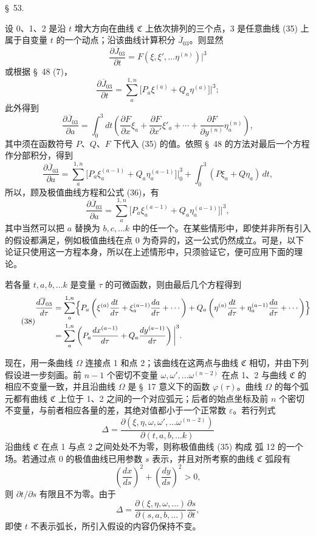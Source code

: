 \documentclass[11pt,a4paper,leqno]{article}
\begin{document}
\begin{center}
{\large \S~53.}
\end{center}

设 0、1、2 是沿 $t$ 增大方向在曲线 $\mathfrak{C}$ 上依次排列的三个点，3 是任意曲线 (35) 上属于自变量 $t$ 的一个动点；沿该曲线计算积分 $\overline{J}_{03}$。则显然
\[
\frac{\partial\overline{J}_{03}}{\partial t}
=F(\xi,\xi',\ldots\eta^{(n)})\bigg|^3
\]
或根据 \S~48 (7)，
\[
\frac{\partial\overline{J}_{03}}{\partial t}
=\sum_a^{1,n}\bigl[P_a\xi^{(a)}+Q_a\eta^{(a)}\bigr]\bigg|^3;
\]
此外得到
\[
\frac{\partial\overline{J}_{03}}{\partial a}
=\int_0^3 dt\left(\frac{\partial F}{\partial x}\xi_a+
\frac{\partial F}{\partial x'}\xi'_a+\cdots+
\frac{\partial F}{\partial y^{(n)}}\eta_a^{(n)}\right),
\]
其中须在函数符号 $P$、$Q$、$F$ 下代入 (35) 的值。依照 \S~48 的方法对最后一个方程作分部积分，得到
\[
\frac{\partial\overline{J}_{03}}{\partial a}
=\sum_a^{1,n}\bigl[P_a\xi_a^{(a-1)}+Q_a\eta_a^{(a-1)}\bigr]\bigg|_0^3
+\int_0^3(P\xi_a+Q\eta_a)\,dt,
\]
所以，顾及极值曲线方程和公式 (36)，有
\begin{equation}\tag{37}
\frac{\partial\overline{J}_{03}}{\partial a}
=\sum_a^{1,n}\bigl[P_a\xi_a^{(a-1)}+Q_a\eta_a^{(a-1)}\bigr]\bigg|^3,
\end{equation}
其中当然可以把 $a$ 替换为 $b,c,\ldots k$ 中的任一个。在某些情形中，即使并非所有引入的假设都满足，例如极值曲线在点 0 为奇异的，这一公式仍然成立。可是，以下论证只使用这一方程本身，所以在上述情形中，只须验证它，便可应用下面的理论。

若各量 $t,a,b,\ldots k$ 是变量 $\tau$ 的可微函数，则由最后几个方程得到
\begin{equation}\tag{38}
\begin{aligned}
\frac{d\overline{J}_{03}}{d\tau}
&=\sum_a^{1,n}\Bigl\{
P_a\left(\xi^{(a)}\frac{dt}{d\tau}+\xi_a^{(a-1)}\frac{da}{d\tau}+\cdots\right)
+Q_a\left(\eta^{(a)}\frac{dt}{d\tau}+\eta_a^{(a-1)}\frac{da}{d\tau}+\cdots\right)
\Bigr\}\\
&=\sum_a^{1,n}\left(P_a\frac{dx^{(a-1)}}{d\tau}
+Q_a\frac{dy^{(a-1)}}{d\tau}\right)\bigg|^3 .
\end{aligned}
\end{equation}

现在，用一条曲线 $\Omega$ 连接点 1 和点 2；该曲线在这两点与曲线 $\mathfrak{C}$ 相切，并由下列假设进一步刻画。前 $n-1$ 个密切不变量 $\omega,\omega',\ldots\omega^{(n-2)}$ 在点 1、2 与曲线 $\mathfrak{C}$ 的相应不变量一致，并且沿曲线 $\Omega$ 是 \S~17 意义下的函数 $\varphi(\tau)$。曲线 $\Omega$ 的每个弧元都有曲线 $\mathfrak{C}$ 上位于 1、2 之间的一个对应弧元；后者的始点坐标及前 $n$ 个密切不变量，与前者相应各量的差，其绝对值都小于一个正常数 $\varepsilon$。若行列式
\[
\Delta=\frac{\partial(\xi,\eta,\omega,\omega',\ldots\omega^{(n-2)})}
{\partial(t,a,b,\ldots k)}
\]
沿曲线 $\mathfrak{C}$ 在点 1 与点 2 之间处处不为零，则称极值曲线 (35) 构成
弧 12 的一个场。若通过点 0 的极值曲线已用参数 $s$ 表示，并且对所考察的曲线 $\mathfrak{C}$ 弧段有
\[
\left(\frac{dx}{ds}\right)^2+\left(\frac{dy}{ds}\right)^2>0,
\]
则 $\partial t/\partial s$ 有限且不为零。由于
\[
\Delta=\frac{\partial(\xi,\eta,\omega,\ldots)}{\partial(s,a,b,\ldots)}
\frac{\partial s}{\partial t},
\]
即使 $t$ 不表示弧长，所引入假设的内容仍保持不变。
\end{document}

